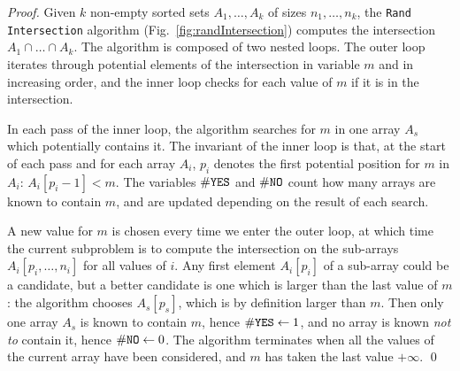 \begin{proof}
Given $k$ non-empty sorted sets $A_1,\ldots,A_k$ of sizes
$n_1,\ldots,n_k$, the {\tt Rand Intersection} algorithm
(Fig.~\ref{fig:randIntersection}) computes the intersection
$A_1{\cap}\ldots{\cap} A_k$.
%
The algorithm is composed of two nested loops.
%
The outer loop iterates through potential elements of the intersection
in variable $m$ and in increasing order, and the inner loop checks for
each value of $m$ if it is in the intersection.

In each pass of the inner loop, the algorithm searches for $m$ in one
array $A_s$ which potentially contains it.
%
The invariant of the inner loop is that, at the start of each pass and
for each array $A_i$, $p_i$ denotes the first potential position for
$m$ in $A_i$: $A_i[p_i-1]<m$.
%
The variables $\#{\hbox{\tt YES}}$ and $\#{\hbox{\tt NO}}$ count how
many arrays are known to contain $m$, and are updated depending on the
result of each search.

A new value for $m$ is chosen every time we enter the outer loop, at
which time the current subproblem is to compute the intersection on the
sub-arrays $A_i[p_i,\ldots,n_i]$ for all values of $i$.
%
Any first element $A_i[p_i]$ of a sub-array could be a candidate, but
a better candidate is one which is larger than the last value of $m$:
%
the algorithm chooses $A_s[p_s]$, which is by definition larger than
$m$.
%
Then only one array $A_s$ is known to contain $m$, hence
$\#{\hbox{\tt YES}}\leftarrow 1$, and no array is known {\em not to} contain it,
hence $\#{\hbox{\tt NO}}\leftarrow 0$.
%
The algorithm terminates when all the values of the current array have
been considered, and $m$ has taken the last value $+\infty$.
\qed\end{proof}


